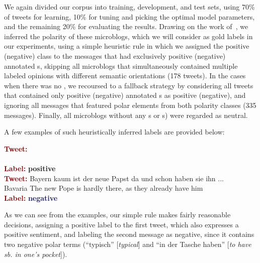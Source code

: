 We again divided our corpus into training, development, and test sets,
using 70\% of tweets for learning, 10\% for tuning and picking the
optimal model parameters, and the remaining 20\% for evaluating the
results.  Drawing on the work of~\citet{Wiebe:05a}, we inferred the
polarity of these microblogs, which we will consider as gold labels in
our experiments, using a simple heuristic rule in which we assigned
the positive (negative) class to the messages that had exclusively
positive (negative) annotated s, skipping all
microblogs that simultaneously contained multiple labeled opinions
with different semantic orientations (178 tweets). In the cases when
there was no , we recoursed to a fallback strategy
by considering all tweets that contained only positive (negative)
annotated s as positive (negative), and ignoring
all messages that featured polar elements from both polarity classes
(335 messages).  Finally, all microblogs without any
s or s) were regarded as
neutral.

A few examples of such heuristically inferred labels are provided
below:
\begin{example}\label{snt:cgsa:exmp:anno1}
  \noindent\textup{\bfseries\textcolor{darkred}{Tweet:}} {\upshape
    }\\
  \noindent {}\\
  \noindent\textup{\bfseries\textcolor{darkred}{Label:}}\hspace*{2em}\textbf{%
    \upshape\textcolor{green3}{positive}}\\[1.5em]
  \noindent\textup{\bfseries\textcolor{darkred}{Tweet:}} {\upshape
     Bayern kaum ist der
    neue Papst da und schon haben sie ihn
     ...}\\
  \noindent {} Bavaria The new
  Pope is hardly there, as they already have him
  \\
  \noindent\textup{\bfseries\textcolor{darkred}{Label:}}\hspace*{2em}\textbf{%
    \upshape\textcolor{midnightblue}{negative}}
\end{example}
As we can see from the examples, our simple rule makes fairly
reasonable decisions, assigning a positive label to the first tweet,
which also expresses a positive sentiment, and labeling the second
message as negative, since it contains two negative polar terms
(``typisch'' [\emph{typical}] and ``in der Tasche haben'' [\emph{to
    have sb. in one's pocket}]).

